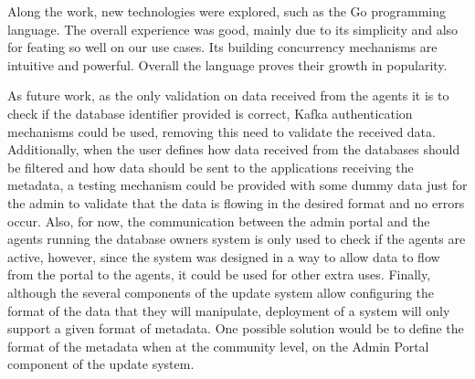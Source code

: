 Along the work, new technologies were explored, such as the Go programming language.
The overall experience was good, mainly due to its simplicity and also for feating so well on our use cases.
Its building concurrency mechanisms are intuitive and powerful.
Overall the language proves their growth in popularity.

As future work, as the only validation on data received from the agents it is to check if the database identifier provided is correct, Kafka authentication mechanisms could be used, removing this need to validate the received data.
Additionally, when the user defines how data received from the databases should be filtered and how data should be sent to the applications receiving the metadata, a testing mechanism could be provided with some dummy data just for the admin to validate that the data is flowing in the desired format and no errors occur.
Also, for now, the communication between the admin portal and the agents running the database owners system is only used to check if the agents are active, however, since the system was designed in a way to allow data to flow from the portal to the agents, it could be used for other extra uses.
Finally, although the several components of the update system allow configuring the format of the data that they will manipulate, deployment of a system will only support a given format of metadata.
One possible solution would be to define the format of the metadata when at the community level, on the Admin Portal component of the update system.
